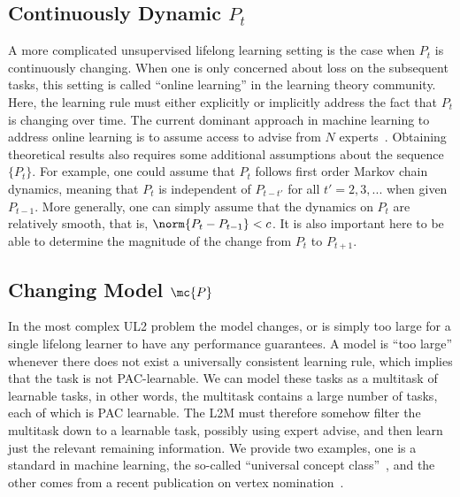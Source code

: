 \documentclass{article}
\begin{document}
\subsection{Continuously Dynamic $P_t$}
\label{sec:smooth}

A  more complicated unsupervised lifelong learning setting is the case when $P_t$ is continuously changing. When one is only concerned about loss on the subsequent tasks, this setting is  called ``online learning'' in the learning theory community. Here, the learning rule must either explicitly or implicitly address the fact that $P_t$ is  changing over time.  The current dominant approach in machine learning to address online learning is to assume access to advise from $N$ experts~\cite{Mohri2018-tf}. 
% 
Obtaining theoretical results also requires some additional assumptions about the sequence $\{P_t\}$.
For example, one could assume that $P_t$ follows  first order Markov chain dynamics, meaning that $P_t$ is independent of $P_{t-t'}$  for all $t'=2,3,...$ when given $P_{t-1}$.  More generally, one can simply assume that the dynamics on $P_t$ are relatively smooth, that is, $\norm{P_t - P_{t-1}} < c$. It is also important here to be able to determine the magnitude of the change from $P_t$ to $P_{t+1}$. 



\subsection{Changing Model $\mc{P}$}
\label{sec:model}

In the most complex  UL2 problem  the model changes, or is simply too large for a single lifelong learner to have any performance guarantees. A model is ``too large'' whenever there does not exist a universally consistent learning rule, which implies that the task is not PAC-learnable. We can model these tasks as a multitask of learnable tasks, in other words, the multitask contains a large number of tasks, each of which is PAC learnable.  The L2M must therefore somehow filter the multitask down to a learnable task, possibly using expert advise, and then learn just the relevant remaining information.  We provide two examples, one is a standard in machine learning, the so-called ``universal concept class''~\cite{Mohri2018-tf}, and the other comes from a recent publication on vertex nomination~\cite{Lyzinski2017-jh}.  
\end{document}

